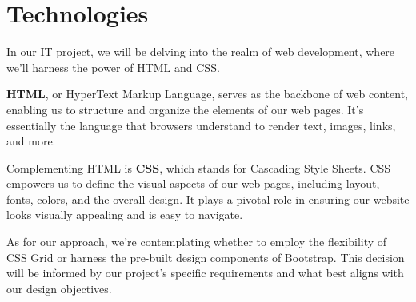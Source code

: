 \documentclass{article}
\begin{document}
    \newpage
    \section{Technologies}
In our IT project, we will be delving into the realm of web development, where we'll harness the power of HTML and CSS.

\textbf{HTML}, or HyperText Markup Language, serves as the backbone of web content, enabling us to structure and organize the elements of our web pages. It's essentially the language that browsers understand to render text, images, links, and more.

Complementing HTML is \textbf{CSS}, which stands for Cascading Style Sheets. CSS empowers us to define the visual aspects of our web pages, including layout, fonts, colors, and the overall design. It plays a pivotal role in ensuring our website looks visually appealing and is easy to navigate.

As for our approach, we're contemplating whether to employ the flexibility of CSS Grid or harness the pre-built design components of Bootstrap. This decision will be informed by our project's specific requirements and what best aligns with our design objectives.
\end{document}
